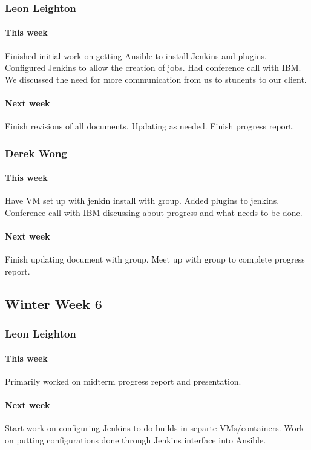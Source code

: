 \documentclass[10pt,letterpaper,onecolumn,draftclsnofoot]{IEEEtran}
\begin{document}
\subsubsection{Leon Leighton}
\paragraph{This week}Finished initial work on getting Ansible to install Jenkins and plugins.  
Configured Jenkins to allow the creation of jobs.  
Had conference call with IBM. We discussed the need for more communication from us to students to our client.
\paragraph{Next week}Finish revisions of all documents. Updating as needed.  
Finish progress report.

\subsubsection{Derek Wong}
\paragraph{This week}Have VM set up with jenkin install with group.       
Added plugins to jenkins.      
Conference call with IBM discussing about progress and what needs to be done. 
\paragraph{Next week}Finish updating document with group.       
Meet up with group to complete progress report.


\subsection{Winter Week 6}
\subsubsection{Leon Leighton}
\paragraph{This week}Primarily worked on midterm progress report and presentation.
\paragraph{Next week}Start work on configuring Jenkins to do builds in separte VMs/containers.  
Work on putting configurations done through Jenkins interface into Ansible.
\end{document}
